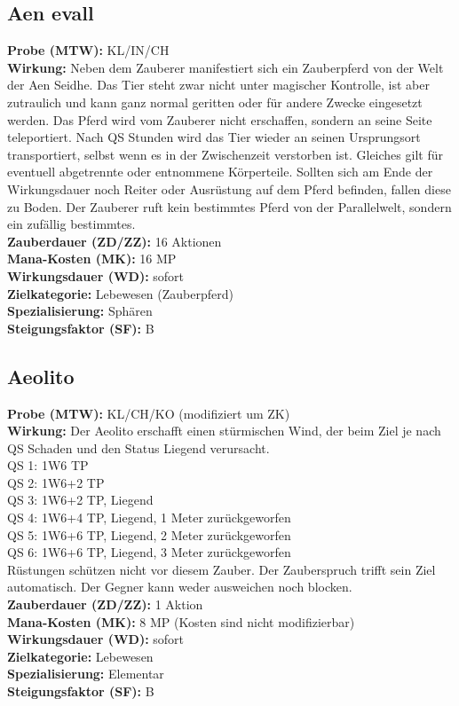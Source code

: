 \subsection{Aen evall}
\label{chap:aen_evall}
\textbf{Probe (MTW):} KL/IN/CH \\
\textbf{Wirkung:} Neben dem Zauberer manifestiert sich ein Zauberpferd von der Welt der Aen Seidhe. Das Tier steht zwar nicht unter magischer Kontrolle, ist aber zutraulich und kann ganz normal geritten oder für andere Zwecke eingesetzt werden. Das Pferd wird vom Zauberer nicht erschaffen, sondern an seine Seite teleportiert. Nach QS Stunden wird das Tier wieder an seinen Ursprungsort transportiert, selbst wenn es in der Zwischenzeit verstorben ist. Gleiches gilt für eventuell abgetrennte oder entnommene Körperteile. Sollten sich am Ende der Wirkungsdauer noch Reiter oder Ausrüstung auf dem Pferd befinden, fallen diese zu Boden. Der Zauberer ruft kein bestimmtes Pferd von der Parallelwelt, sondern ein zufällig bestimmtes.\\
\textbf{Zauberdauer (ZD/ZZ):} 16 Aktionen \\
\textbf{Mana-Kosten (MK):} 16 MP \\
\textbf{Wirkungsdauer (WD):} sofort \\
\textbf{Zielkategorie:} Lebewesen (Zauberpferd) \\
\textbf{Spezialisierung:} Sphären \\
\textbf{Steigungsfaktor (SF):} B


\subsection{Aeolito}
\label{chap:aeolito}
\textbf{Probe (MTW):} KL/CH/KO (modifiziert um ZK) \\
\textbf{Wirkung:} Der Aeolito erschafft einen stürmischen Wind, der beim Ziel je nach QS Schaden und den Status Liegend verursacht.\\
QS 1: 1W6 TP\\
QS 2: 1W6+2 TP\\
QS 3: 1W6+2 TP, Liegend\\
QS 4: 1W6+4 TP, Liegend, 1 Meter zurückgeworfen\\
QS 5: 1W6+6 TP, Liegend, 2 Meter zurückgeworfen\\
QS 6: 1W6+6 TP, Liegend, 3 Meter zurückgeworfen\\
Rüstungen schützen nicht vor diesem Zauber. Der Zauberspruch trifft sein Ziel automatisch. Der Gegner kann weder ausweichen noch blocken.
 \\
\textbf{Zauberdauer (ZD/ZZ):} 1 Aktion \\
\textbf{Mana-Kosten (MK):} 8 MP (Kosten sind nicht modifizierbar) \\
\textbf{Wirkungsdauer (WD):} sofort \\
\textbf{Zielkategorie:} Lebewesen \\
\textbf{Spezialisierung:} Elementar \\
\textbf{Steigungsfaktor (SF):} B



